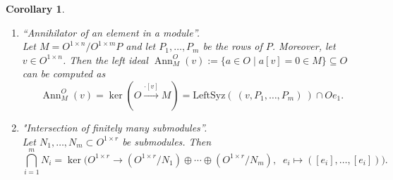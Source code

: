\documentclass[a4paper,10pt]{article}
\newtheorem{Corollary}[Th]{Corollary}
\theoremstyle{nonumberplain}
\DeclareMathOperator{\ann}{Ann}
\begin{document}
\begin{Corollary}
\label{corBasics}
\begin{enumerate}
\item \textit{``Annihilator of an element in a module''}. \\

Let $M = O^{1 \times n}/O^{1\times m}P$ and let $P_1,\ldots,P_m$ be the 
rows of $P$.
Moreover, let $v \in O^{1\times n}$. Then the left ideal 
$\ann_M^{O} (v) := \{ a\in O \mid a[v] = 0 \in M\}\subseteq O$ 
can be computed as
\[
\ann_M^{O} (v) 
= \ker (O \stackrel{\cdot [v]}{\rightarrow} M)
= \mathrm{LeftSyz}(\ (v,P_1,\ldots,P_m)\ ) \cap O e_1.
\]


\item \textit{"Intersection of finitely many submodules''}. \\

Let $N_1, \ldots, N_m \subset O^{1\times r}$ be submodules. Then
\[
\bigcap_{i=1}^m N_i = \ker \bigl(
O^{1\times r} \rightarrow (O^{1\times r} / N_1) \oplus \cdots \oplus (O^{1\times r} / N_m),
\;\; e_i \mapsto ([e_i],\ldots,[e_i]) \bigr).
\]
\end{enumerate}
\end{Corollary}
\end{document}
